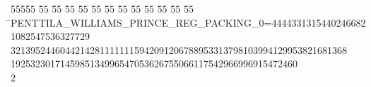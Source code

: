 %
%
\begin{tabbing}
55555 \= 55 \= 55 \= 55 \= 55 \= 55 \= 55 \= 55 \= 55 \= 55 \= 55 \= 55 \= 55 \= \>PENTTILA\_WILLIAMS\_PRINCE\_REG\_PACKING\_0=44443313154402466821082547536327729\\[0pt]
\>32139524460442142811111115942091206788953313798103994129953821681368\\[0pt]
1925323017145985134996547053626755066117542966996915472460\\[0pt]
2\>\end{tabbing}
